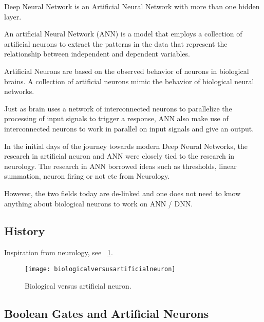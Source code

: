 	\begin{bulletedlist}
		\item Deep Neural Network is an Artificial Neural Network with more than one hidden layer.
		\item An artificial Neural Network (ANN) is a model that employs a collection of artificial neurons to extract the patterns in the data that represent the relationship between independent and dependent variables.
		\item Artificial Neurons are based on the observed behavior of neurons in biological brains. A collection of artificial neurons mimic the behavior of biological neural networks.
		\item Just as brain uses a network of interconnected neurons to parallelize the processing of input signals to trigger a response, ANN also make use of interconnected neurons to work in parallel on input signals and give an output.
		\item In the initial days of the journey towards modern Deep Neural Networks, the research in artificial neuron and ANN were closely tied to the research in
neurology. The research in ANN borrowed ideas such as thresholds, linear summation, neuron firing or not etc from Neurology.
		\item However, the two fields today are de-linked and one does not need to know anything about biological neurons to work on ANN / DNN.
	\end{bulletedlist}

	\subsection{History}
Inspiration from neurology, see \figurename~\ref{fig:biologicalversusartificialneuron}.
 	\begin{figure}[htb]
		\centering
		\texttt{[image: biologicalversusartificialneuron]}
		\caption[Biological versus artificial neuron]{Biological versus artificial neuron.}
		\label{fig:biologicalversusartificialneuron}
	\end{figure}

	\subsection{Boolean Gates and Artificial Neurons}

